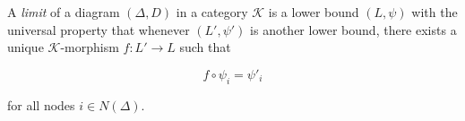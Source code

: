 A \emph{limit} of a diagram $(\Delta, D)$ in a category $\mathcal{K}$ is a lower bound $(L, \psi)$ with the universal property that whenever $(L', \psi')$ is another lower bound, there exists a unique $\mathcal{K}$-morphism $f: L' \longrightarrow L$ such that

$$f \circ \psi_i = \psi'_i$$

for all nodes $i \in N(\Delta)$.

